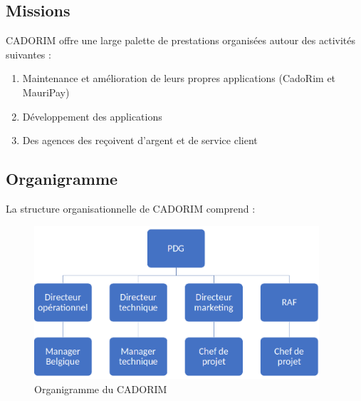 \subsection{Missions}
CADORIM offre une large palette de prestations organisées autour des activités suivantes :
\begin{enumerate}
	
	\item Maintenance et amélioration de leurs propres applications (CadoRim et MauriPay)
	\item Développement des applications 
	\item Des agences des reçoivent d'argent et de service client
	
\end{enumerate}
\subsection{Organigramme}
La structure organisationnelle de CADORIM comprend :
\begin{figure}[h]
	\includegraphics[scale=0.8,width=400px]{./Template LaTeX/Images/og.png}
	\centering
	\caption{Organigramme du CADORIM}
\end{figure}
